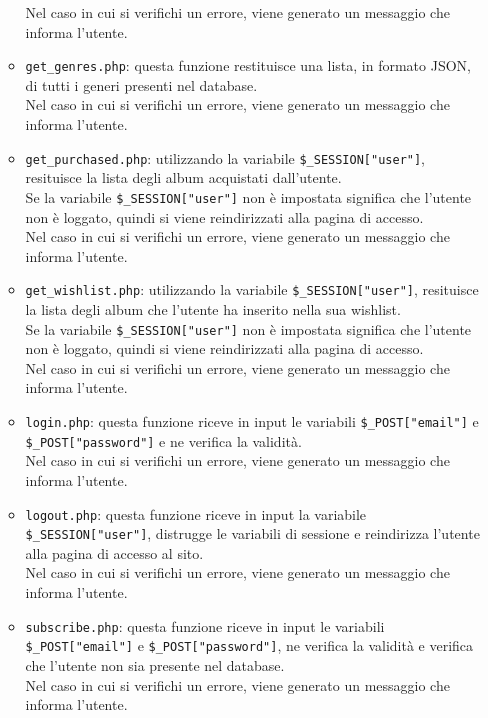 \begin{itemize}
\begin{itemize}
            Nel caso in cui si verifichi un errore, viene generato un messaggio che informa l'utente.
            \item \texttt{get\_genres.php}: questa funzione restituisce una lista, in formato JSON, di tutti i generi presenti nel database. \\
            Nel caso in cui si verifichi un errore, viene generato un messaggio che informa l'utente.
            \item \texttt{get\_purchased.php}: utilizzando la variabile \texttt{\$\_SESSION["user"]}, resituisce la lista degli album acquistati dall'utente. \\
            Se la variabile \texttt{\$\_SESSION["user"]} non è impostata significa che l'utente non è loggato, quindi si viene reindirizzati alla pagina di accesso.\\
            Nel caso in cui si verifichi un errore, viene generato un messaggio che informa l'utente.
            \item \texttt{get\_wishlist.php}: utilizzando la variabile \texttt{\$\_SESSION["user"]}, resituisce la lista degli album che l'utente ha inserito nella sua wishlist. \\
            Se la variabile \texttt{\$\_SESSION["user"]} non è impostata significa che l'utente non è loggato, quindi si viene reindirizzati alla pagina di accesso.\\
            Nel caso in cui si verifichi un errore, viene generato un messaggio che informa l'utente.
            \item \texttt{login.php}: questa funzione riceve in input le variabili \texttt{\$\_POST["email"]} e \texttt{\$\_POST["password"]} e ne verifica la validità.\\
            Nel caso in cui si verifichi un errore, viene generato un messaggio che informa l'utente.
            \item \texttt{logout.php}: questa funzione riceve in input la variabile \texttt{\$\_SESSION["user"]}, distrugge le variabili di sessione e reindirizza l'utente alla pagina di accesso al sito.\\
            Nel caso in cui si verifichi un errore, viene generato un messaggio che informa l'utente.
            \item \texttt{subscribe.php}: questa funzione riceve in input le variabili \texttt{\$\_POST["email"]} e \texttt{\$\_POST["password"]}, ne verifica la validità e verifica che l'utente non sia presente nel database.\\
            Nel caso in cui si verifichi un errore, viene generato un messaggio che informa l'utente.

\end{itemize}
\end{itemize}
